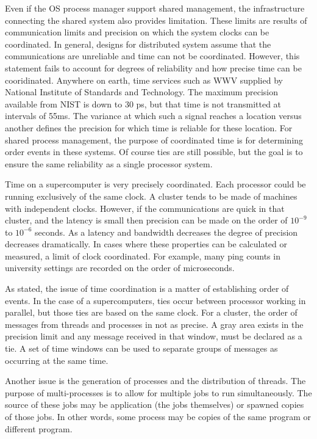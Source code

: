 \documentclass[11pt]{article}
\begin{document}
 Even if the OS process manager support shared management, the infrastructure connecting the shared system also provides limitation.  These limits are results of communication limits and precision on which the system clocks can be coordinated.  In general, designs for distributed system assume that the communications are unreliable and time can not be coordinated.   However, this statement fails to account for degrees of reliability and how precise time can be cooridinated.  Anywhere on earth, time services such as WWV supplied by National Institute of Standards and Technology.  \cite {lombardi}  The maximum precision available from NIST is down to 30 ps, but that time is not transmitted at intervals of 55ms.  The variance at which such a signal reaches a location versus another defines the precision for which time is reliable for these location.  For shared process management, the purpose of coordinated time is for determining order events in these systems.  Of course ties are still possible, but the goal is to ensure the same reliability as a single processor system.  
 
 Time on a supercomputer is very precisely coordinated.  Each processor could be running exclusively of the same clock.  A cluster tends to be made of machines with independent clocks.  However, if the communications are quick in that cluster, and the latency is small then precision can be made on the order of $10^{-9}$ to $10^{-6}$ seconds.  As a latency and bandwidth decreases the degree of precision decreases dramatically.  In cases where these properties can be calculated or measured, a limit of clock coordinated.  For example, many ping counts in university settings are recorded on the order of microseconds.  
 
 As stated, the issue of time coordination is a matter of establishing order of events.  In the case of a supercomputers, ties occur between processor working in parallel, but those ties are based on the same clock.  For a cluster, the order of messages from threads and processes in not as precise.  A gray area exists in the precision limit and any message received in that window, must be declared as a tie.  A set of time windows can be used to separate groups of messages as occurring at the same time.  
 
 Another issue is the generation of processes and the distribution of threads.  The purpose of multi-processes is to allow for multiple jobs to run simultaneously.  The source of these jobs may be application (the jobs themselves) or spawned copies of those jobs.  In other words, some process may be copies of the same program or different program.  
 
\end{document}
